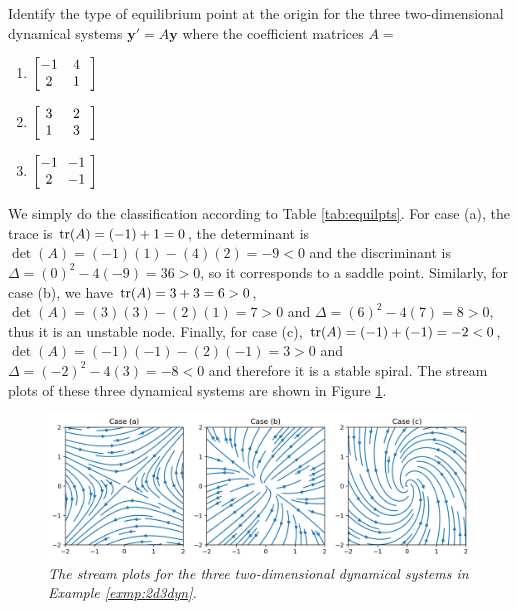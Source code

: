 \begin{exmp}
\label{exmp:2d3dyn}
Identify the type of equilibrium point at the origin for the three two-dimensional dynamical systems $\textbf{y}' = A\textbf{y}$ where the coefficient matrices $A = $ 
\begin{enumerate}[label=(\alph*)]
    \item $\left[\begin{array}{@{\,}wc{10pt}wc{10pt}wc{10pt}@{}}
    -1 & 4 \\
    2 & 1
    \end{array}\right]$
    \item $\left[\begin{array}{@{\,}wc{10pt}wc{10pt}wc{10pt}@{}}
    3 & 2 \\
    1 & 3
    \end{array}\right]$
    \item $\left[\begin{array}{@{\,}wc{10pt}wc{10pt}wc{10pt}@{}}
    -1 & -1 \\
    2 & -1
    \end{array}\right]$
\end{enumerate}
\end{exmp}
\begin{solution}
We simply do the classification according to Table \ref{tab:equilpts}. For case (a), the trace is $\tr(A) = (-1) + 1 = 0$, the determinant is $\det(A) = (-1)(1) - (4)(2) = -9 < 0$ and the discriminant is $\Delta = (0)^2 - 4(-9) = 36 > 0$, so it corresponds to a saddle point. Similarly, for case (b), we have $\tr(A) = 3 + 3 = 6 > 0$, $\det(A) = (3)(3) - (2)(1) = 7 > 0$ and $\Delta = (6)^2 - 4(7) = 8 > 0$, thus it is an unstable node. Finally, for case (c), $\tr(A) = (-1) + (-1) = -2 < 0$, $\det(A) = (-1)(-1) - (2)(-1) = 3 > 0$ and $\Delta = (-2)^2 - 4(3) = -8 < 0$ and therefore it is a stable spiral. The stream plots of these three dynamical systems are shown in Figure \ref{fig:2d3dyn}. 
\end{solution}

\begin{figure}
    \centering
    \includegraphics[width=\textwidth]{graphics/3exmps2ddynamic.png}
    \caption{\textit{The stream plots for the three two-dimensional dynamical systems in Example \ref{exmp:2d3dyn}.}}
    \label{fig:2d3dyn}
\end{figure}

